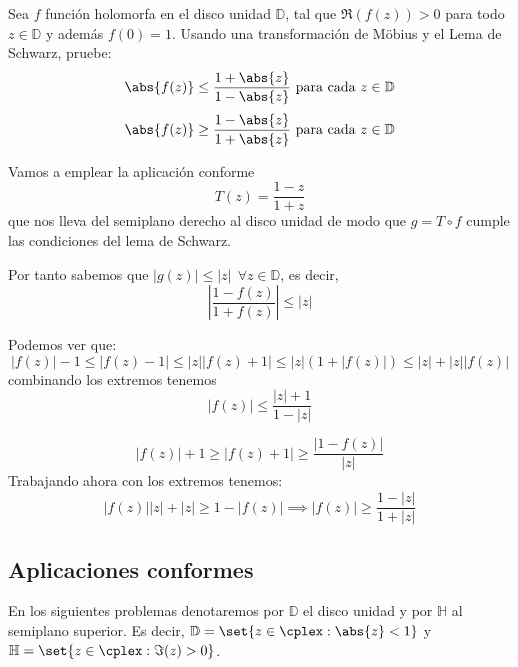 \begin{problem}[6]
Sea $f$ función holomorfa en el disco unidad $\mathbb{D}$, tal que $\Re(f(z)) > 0$ para todo $z \in \mathbb{D}$ y además $f(0) = 1$. Usando una transformación de Möbius y el Lema de Schwarz, pruebe:
\ppart
\[\abs{f(z)} \leq \frac{1 + \abs{z}}{1 - \abs{z}} \text{ para cada } z \in \mathbb{D}\]
\ppart
\[\abs{f(z)} \geq \frac{1 - \abs{z}}{1 + \abs{z}} \text{ para cada } z \in \mathbb{D}\]
\solution

\spart

Vamos a emplear la aplicación conforme
\[T(z)=\frac{1-z}{1+z}\]
que nos lleva del semiplano derecho al disco unidad de modo que $g=T \circ f$ cumple las condiciones del lema de Schwarz.

Por tanto sabemos que $|g(z)| \leq |z| \ \ \forall z \in \mathbb{D}$, es decir,
\[\left| \frac{1-f(z)}{1+f(z)}\right| \leq |z|\]

Podemos ver que:
\[|f(z)|-1 \leq |f(z)-1| \leq |z||f(z)+1| \leq |z|(1+|f(z)|)\leq |z| + |z||f(z)|\]
combinando los extremos tenemos
\[|f(z)|\leq \frac{|z|+1}{1-|z|}\]

\spart


\[|f(z)|+1 \geq |f(z)+1| \geq \frac{|1-f(z)|}{|z|}\]
Trabajando ahora con los extremos tenemos:
\[|f(z)||z|+|z| \geq 1-|f(z)| \implies |f(z)| \geq \frac{1-|z|}{1+|z|}\]


\end{problem}



\subsection{Aplicaciones conformes}
En los siguientes problemas denotaremos por $\mathbb{D}$ el disco unidad y por $\mathbb{H}$ al semiplano superior. Es decir, $\mathbb{D} = \set{z \in \cplex: \abs{z} < 1}$ y $\mathbb{H} = \set{z \in \cplex: \Im(z) > 0}$.

